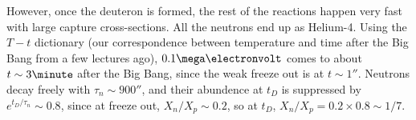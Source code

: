 \documentclass[a4paper,twoside,master.tex]{subfiles}
\begin{document}
However, once the deuteron is formed, the rest of the reactions happen very fast with large capture cross-sections. All the neutrons end up as Helium-4. Using the $ T-t $ dictionary (our correspondence between temperature and time after the Big Bang from a few lectures ago), $ 0.1 \mega\electronvolt $ comes to about $ t \sim 3 \minute $ after the Big Bang, since the weak freeze out is at $ t \sim 1 \second $. Neutrons decay freely with $ \tau_n \sim 900 \second $, and their abundence at $ t_D $ is suppressed by $ e^{t_D / \tau_n} \sim 0.8 $, since at freeze out, $ X_n / X_p \sim 0.2 $, so at $ t_D $, $ X_n / X_p = 0.2 \times 0.8 \sim 1/7 $.
\end{document}
